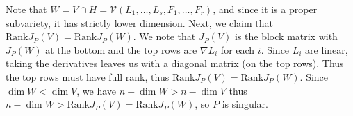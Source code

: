 \documentclass[11pt]{book}
\begin{document}
\begin{problem}
Note that $W=V\cap H=\mathcal{V}(L_1,\dots,L_s,F_1,\dots,F_r)$, and since it is a proper subvariety, it has strictly lower dimension. Next, we claim that $\mathrm{Rank}J_P(V)=\mathrm{Rank}J_P(W)$. We note that $J_P(V)$ is the block matrix with $J_P(W)$ at the bottom and the top rows are $\nabla L_i$ for each $i$. Since $L_i$ are linear, taking the derivatives leaves us with a diagonal matrix (on the top rows). Thus the top rows must have full rank, thus $\mathrm{Rank}J_P(V)=\mathrm{Rank}J_P(W)$. Since $\dim W<\dim V$, we have $n-\dim W>n-\dim V$ thus $n-\dim W>\mathrm{Rank}J_P(V)=\mathrm{Rank}J_P(W)$, so $P$ is singular.
\end{problem}
\end{document}
